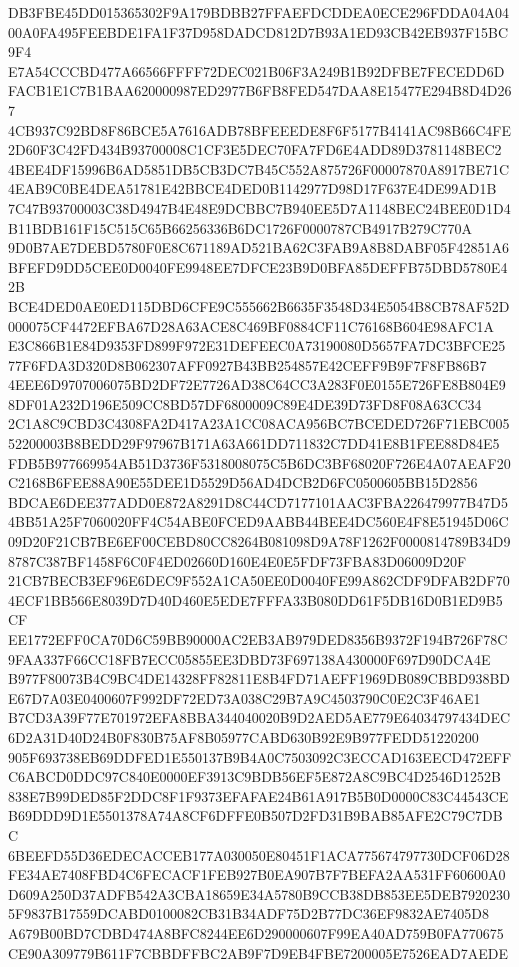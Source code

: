 \documentclass[UTF8,fontset=fandol,zihao=-4,a4paper]{ctexart}
\begin{document}
{{DB3FBE45DD015365302F9A179BDBB27FFAEFDCDDEA0ECE296FDDA04A0400A0FA495FEEBDE1FA1F37D958DADCD812D7B93A1ED93CB42EB937F15BC9F4
E7A54CCCBD477A66566FFFF72DEC021B06F3A249B1B92DFBE7FECEDD6DFACB1E1C7B1BAA620000987ED2977B6FB8FED547DAA8E15477E294B8D4D267
4CB937C92BD8F86BCE5A7616ADB78BFEEEDE8F6F5177B4141AC98B66C4FE2D60F3C42FD434B93700008C1CF3E5DEC70FA7FD6E4ADD89D3781148BEC2
4BEE4DF15996B6AD5851DB5CB3DC7B45C552A875726F00007870A8917BE71C4EAB9C0BE4DEA51781E42BBCE4DED0B1142977D98D17F637E4DE99AD1B
7C47B93700003C38D4947B4E48E9DCBBC7B940EE5D7A1148BEC24BEE0D1D4B11BDB161F15C515C65B66256336B6DC1726F0000787CB4917B279C770A
9D0B7AE7DEBD5780F0E8C671189AD521BA62C3FAB9A8B8DABF05F42851A6BFEFD9DD5CEE0D0040FE9948EE7DFCE23B9D0BFA85DEFFB75DBD5780E42B
BCE4DED0AE0ED115DBD6CFE9C555662B6635F3548D34E5054B8CB78AF52D000075CF4472EFBA67D28A63ACE8C469BF0884CF11C76168B604E98AFC1A
E3C866B1E84D9353FD899F972E31DEFEEC0A73190080D5657FA7DC3BFCE2577F6FDA3D320D8B062307AFF0927B43BB254857E42CEFF9B9F7F8FB86B7
4EEE6D9707006075BD2DF72E7726AD38C64CC3A283F0E0155E726FE8B804E98DF01A232D196E509CC8BD57DF6800009C89E4DE39D73FD8F08A63CC34
2C1A8C9CBD3C4308FA2D417A23A1CC08ACA956BC7BCEDED726F71EBC00552200003B8BEDD29F97967B171A63A661DD711832C7DD41E8B1FEE88D84E5
FDB5B977669954AB51D3736F5318008075C5B6DC3BF68020F726E4A07AEAF20C2168B6FEE88A90E55DEE1D5529D56AD4DCB2D6FC0500605BB15D2856
BDCAE6DEE377ADD0E872A8291D8C44CD7177101AAC3FBA226479977B47D54BB51A25F7060020FF4C54ABE0FCED9AABB44BEE4DC560E4F8E51945D06C
09D20F21CB7BE6EF00CEBD80CC8264B081098D9A78F1262F0000814789B34D98787C387BF1458F6C0F4ED02660D160E4E0E5FDF73FBA83D06009D20F
21CB7BECB3EF96E6DEC9F552A1CA50EE0D0040FE99A862CDF9DFAB2DF704ECF1BB566E8039D7D40D460E5EDE7FFFA33B080DD61F5DB16D0B1ED9B5CF
EE1772EFF0CA70D6C59BB90000AC2EB3AB979DED8356B9372F194B726F78C9FAA337F66CC18FB7ECC05855EE3DBD73F697138A430000F697D90DCA4E
B977F80073B4C9BC4DE14328FF82811E8B4FD71AEFF1969DB089CBBD938BDE67D7A03E0400607F992DF72ED73A038C29B7A9C4503790C0E2C3F46AE1
B7CD3A39F77E701972EFA8BBA344040020B9D2AED5AE779E64034797434DEC6D2A31D40D24B0F830B75AF8B05977CABD630B92E9B977FEDD51220200
905F693738EB69DDFED1E550137B9B4A0C7503092C3ECCAD163EECD472EFFC6ABCD0DDC97C840E0000EF3913C9BDB56EF5E872A8C9BC4D2546D1252B
838E7B99DED85F2DDC8F1F9373EFAFAE24B61A917B5B0D0000C83C44543CEB69DDD9D1E5501378A74A8CF6DFFE0B507D2FD31B9BAB85AFE2C79C7DBC
6BEEFD55D36EDECACCEB177A030050E80451F1ACA775674797730DCF06D28FE34AE7408FBD4C6FECACF1FEB927B0EA907B7F7BEFA2AA531FF60600A0
D609A250D37ADFB542A3CBA18659E34A5780B9CCB38DB853EE5DEB79202305F9837B17559DCABD0100082CB31B34ADF75D2B77DC36EF9832AE7405D8
A679B00BD7CDBD474A8BFC8244EE6D290000607F99EA40AD759B0FA770675CE90A309779B611F7CBBDFFBC2AB9F7D9EB4FBE7200005E7526EAD7AEDE
}}
\end{document}
